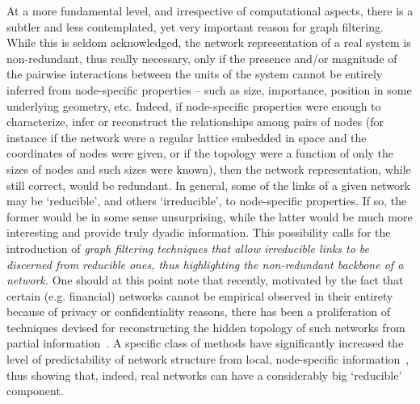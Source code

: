 \documentclass[aps,twocolumn,superscriptaddress]{revtex4-1}
\begin{document}
At a more fundamental level, and irrespective of computational aspects, there is a subtler and less contemplated, yet very important reason for graph filtering.
While this is seldom acknowledged, the network representation of a real system is non-redundant, thus really necessary, only if the presence and/or magnitude of the pairwise interactions between the units of the system cannot be entirely inferred from node-specific properties -- such as size, importance, position in some underlying geometry, etc. 
Indeed, if node-specific properties were enough to characterize, infer or reconstruct the relationships among pairs of nodes (for instance if the network were a regular lattice embedded in space and the coordinates of nodes were given, or if the topology were a function of only the sizes of nodes and such sizes were known), then the network representation, while still correct, would be redundant. 
In general, some of the links of a given network may be `reducible', and others `irreducible', to node-specific properties.
If so, the former would be in some sense unsurprising, while the latter would be much more interesting and provide truly dyadic information.
This possibility calls for the introduction of \emph{graph filtering techniques that allow irreducible links to be discerned from reducible ones, thus highlighting the non-redundant backbone of a network.} 
One should at this point note that recently, motivated by the fact that certain (e.g. financial) networks cannot be empirical observed in their entirety because of privacy or confidentiality reasons, there has been a proliferation of techniques devised for reconstructing the hidden topology of such networks from partial information~\cite{review,book}. 
A specific class of methods have significantly increased the level of predictability of network structure from local, node-specific information~\cite{mastrandrea-njp-2014,mastrandrea-pre-2014,cimini-pre-2015,cimini-2015-scirep,squartini-2017-ans}, thus showing that, indeed, real networks can have a considerably big `reducible' component.
\end{document}
